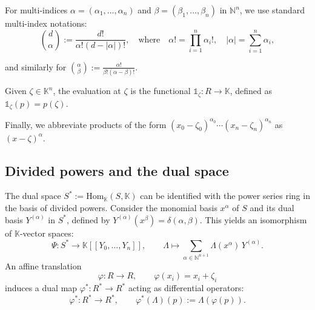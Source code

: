 \documentclass[a4paper,11p]{amsart}
\newcommand{\K}{\mathbb K}
\begin{document}
\medskip

For multi-indices $\alpha = (\alpha_1, \ldots, \alpha_n)$ and $\beta = (\beta_1, \ldots, \beta_n)$ in $\mathbb{N}^n$, we use standard multi-index notations:
\[
\binom{d}{\alpha} := \frac{d!}{\alpha!(d - |\alpha|)!}, \quad \text{where} \quad \alpha! = \prod_{i=1}^n \alpha_i!, \quad |\alpha| = \sum_{i=1}^n \alpha_i,
\]



and similarly for $\binom{\alpha}{\beta}:= \frac{\alpha!}{\beta!(\alpha - \beta)!}$. 

Given $\zeta \in \mathbb{K}^n$, the evaluation at $\zeta$ is the functional $\mathds{1}_\zeta : R \to \mathbb{K}$, defined as $\mathds{1}_\zeta(p) = p(\zeta)$.



Finally, we abbreviate products of the form $(x_0 - \zeta_0)^{\alpha_0} \cdots (x_n - \zeta_n)^{\alpha_n}$ as $(x - \zeta)^\alpha$.

 
\subsection{Divided powers and the dual space}
The dual space $S^* := \mathrm{Hom}_{\mathbb{K}}(S, \mathbb{K})$ can be identified with the power series ring in the basis of divided powers. Consider the monomial basis ${x^\alpha}$ of $S$ and its dual basis ${Y^{(\alpha)}}$ in $S^*$, defined by $Y^{(\alpha)}(x^\beta)=\delta(\alpha, \beta)$. This yields an isomorphism
of $ \K $-vector spaces:
\[
\Psi: S^* \longrightarrow \K[[Y_0, \ldots, Y_n]], \qquad
\Lambda \mapsto \sum_{\alpha \in \mathbb{N}^{n+1}} \Lambda(x^\alpha)\, Y^{(\alpha)}.
\]
An affine translation 
\begin{equation}\label{affine:tranlsation}
\varphi: R \to R, \qquad \varphi(x_i) = x_i + \zeta_i
\end{equation}
induces a dual map $\varphi^*: R^* \to R^*$ acting as differential operators:
\begin{equation}\label{dual:affine:tranlsation}
    \varphi^*: R^* \longrightarrow R^*, \qquad \varphi^*(\Lambda)(p) := \Lambda(\varphi(p)).
\end{equation}
\end{document}
